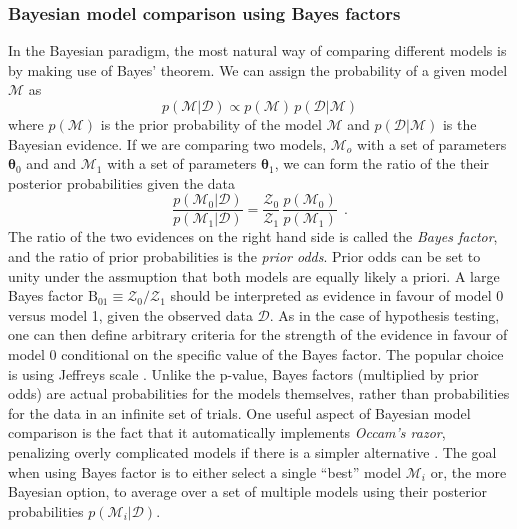 \documentclass[12pt,dvipsnames]{report}
\renewcommand{\vec}[1]{\boldsymbol{\mathbf{#1}}}
\newcommand{\hquad}{~~}
\begin{document}
\subsubsection{Bayesian model comparison using Bayes factors}
In the Bayesian paradigm, the most natural way of comparing different 
models is by making use of  Bayes' theorem. We can assign the probability of a 
given model $\mathcal{M}$ as 
\begin{equation}
    p(\mathcal{M}\lvert\mathcal D)\propto p(\mathcal{M})\,p(\mathcal D\lvert\mathcal{M})
\end{equation}
where $p(\mathcal{M})$ is the prior probability of the model $\mathcal{M}$ and
$p(\mathcal D\lvert\mathcal{M})$ is the Bayesian evidence. If we are comparing two 
models, $\mathcal{M}_o$ with a set of parameters $\vec\theta_0$ and
and $\mathcal{M}_1$ with a set of parameters $\vec\theta_1$, we can form the ratio of 
the their posterior probabilities given the data
\begin{equation}
    \frac{p(\mathcal{M}_0\lvert\mathcal D)}{p(\mathcal{M}_1\lvert\mathcal D)} =
    \frac{\mathcal{Z}_0}{\mathcal{Z}_1} \, \frac{p(\mathcal{M}_0)}{p(\mathcal{M}_1)}\hquad .
\end{equation}
The ratio of the two evidences on the right hand side is called the 
\textsl{Bayes factor}, and the ratio of prior probabilities is the 
\textsl{prior odds}.
Prior odds can be set to unity under the assmuption that both models are equally 
likely a priori.
A large Bayes factor $\textrm{B}_{01}\equiv \mathcal{Z}_0/\mathcal{Z}_1$ should 
be interpreted as evidence in favour of model 0 versus model 1, given the 
observed data $\mathcal D$.
As in the case of hypothesis testing, one can then define arbitrary criteria for
the strength of the evidence in favour of model 0 conditional on the specific value
of the Bayes factor.
The popular choice is using Jeffreys scale \citep{1939thpr.book.....J}.
Unlike the p-value, Bayes factors (multiplied by prior odds)
are actual probabilities for the models
themselves, rather than probabilities for the data in an infinite set of trials.
One useful aspect of Bayesian model comparison is the fact that it automatically
implements \emph{Occam's razor}, penalizing overly complicated models if there
is a simpler alternative \citep[see Chapter 28 of][]{2003itil.book.....M}.
The goal when using Bayes factor is to either select a single ``best'' model
$\mathcal{M}_i$ or, the more Bayesian option, to average over a set of 
multiple models using their  posterior probabilities 
$p(\mathcal{M}_i\lvert\mathcal D)$.
\end{document}
